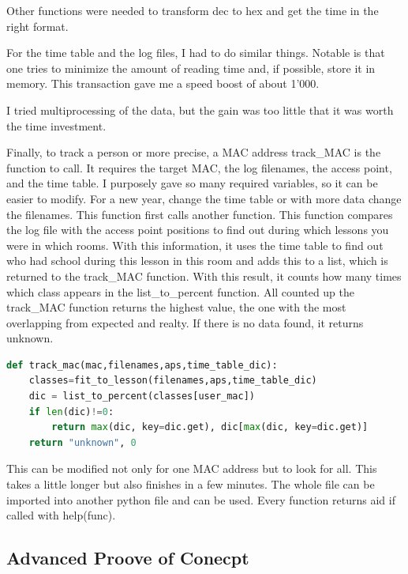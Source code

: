 \documentclass[11pt]{article}
\begin{document}
Other functions were needed to transform dec to hex and get the time in the right format.

For the time table and the log files, I had to do similar things. Notable is that one tries to minimize the amount of reading time and, if possible, store it in memory. This transaction gave me a speed boost of about 1'000.

I tried multiprocessing of the data, but the gain was too little that it was worth the time investment.

Finally, to track a person or more precise, a MAC address track\_MAC is the function to call. It requires the target MAC, the log filenames, the access point, and the time table. I purposely gave so many required variables, so it can be easier to modify. For a new year, change the time table or with more data change the filenames.
This function first calls another function. This function compares the log file with the access point positions to find out during which lessons you were in which rooms. With this information, it uses the time table to find out who had school during this lesson in this room and adds this to a list, which is returned to the track\_MAC function. With this result, it counts how many times which class appears in the list\_to\_percent function. All counted up the track\_MAC function returns the highest value, the one with the most overlapping from expected and realty. If there is no data found, it returns unknown.

\begin{lstlisting}[language=Python,caption="track-mac",style=python]
def track_mac(mac,filenames,aps,time_table_dic):
    classes=fit_to_lesson(filenames,aps,time_table_dic)
    dic = list_to_percent(classes[user_mac])
    if len(dic)!=0:
        return max(dic, key=dic.get), dic[max(dic, key=dic.get)]
    return "unknown", 0
\end{lstlisting}

This can be modified not only for one MAC address but to look for all. This takes a little longer but also finishes in a few minutes. 
The whole file can be imported into another python file and can be used. Every function returns aid if called with help(func).



\subsection{Advanced Proove of Conecpt}
\end{document}
